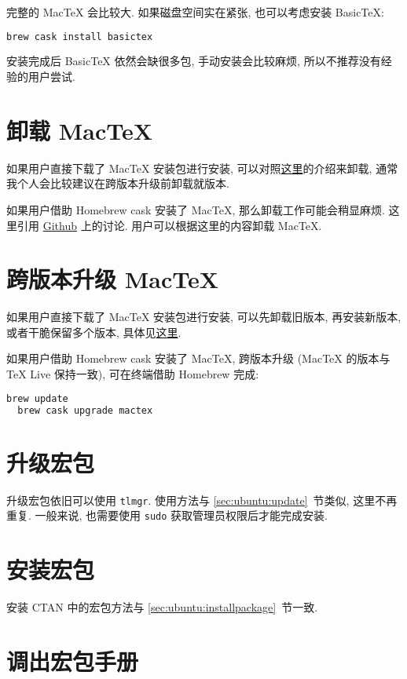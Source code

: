 完整的 Mac\TeX{} 会比较大. 如果磁盘空间实在紧张, 也可以考虑安装 Basic\TeX:
\begin{lstlisting}[language=bash]
  brew cask install basictex
\end{lstlisting}
安装完成后 Basic\TeX{} 依然会缺很多包, 手动安装会比较麻烦, 所以不推荐没有经验的用户尝试.

\section{卸载 Mac\TeX}

如果用户直接下载了 Mac\TeX{} 安装包进行安装,
可以对照\href{https://www.tug.org/mactex/uninstalling.html}{这里}的介绍来卸载,
通常我个人会比较建议在跨版本升级前卸载就版本.

如果用户借助 Homebrew cask 安装了 Mac\TeX,
那么卸载工作可能会稍显麻烦.
这里引用 \href{https://github.com/Homebrew/homebrew-cask/issues/32073}{Github} 上的讨论.
用户可以根据这里的内容卸载 Mac\TeX.

\section{跨版本升级 Mac\TeX}

如果用户直接下载了 Mac\TeX{} 安装包进行安装,
可以先卸载旧版本,
再安装新版本,
或者干脆保留多个版本,
具体见\href{https://www.tug.org/mactex/multipletexdistributions.html}{这里}.

如果用户借助 Homebrew cask 安装了 Mac\TeX,
跨版本升级 (Mac\TeX{} 的版本与 \TeX{} Live 保持一致), 可在\textsf{终端}借助 Homebrew 完成:
\begin{lstlisting}[language=bash]
  brew update
  brew cask upgrade mactex
\end{lstlisting}

\section{升级宏包}

升级宏包依旧可以使用 \texttt{tlmgr}.
使用方法与 \ref{sec:ubuntu:update}~节类似, 这里不再重复.
一般来说, 也需要使用 \texttt{sudo} 获取管理员权限后才能完成安装.

\section{安装宏包}

安装 CTAN 中的宏包方法与 \ref{sec:ubuntu:installpackage}~节一致.

\section{调出宏包手册}

